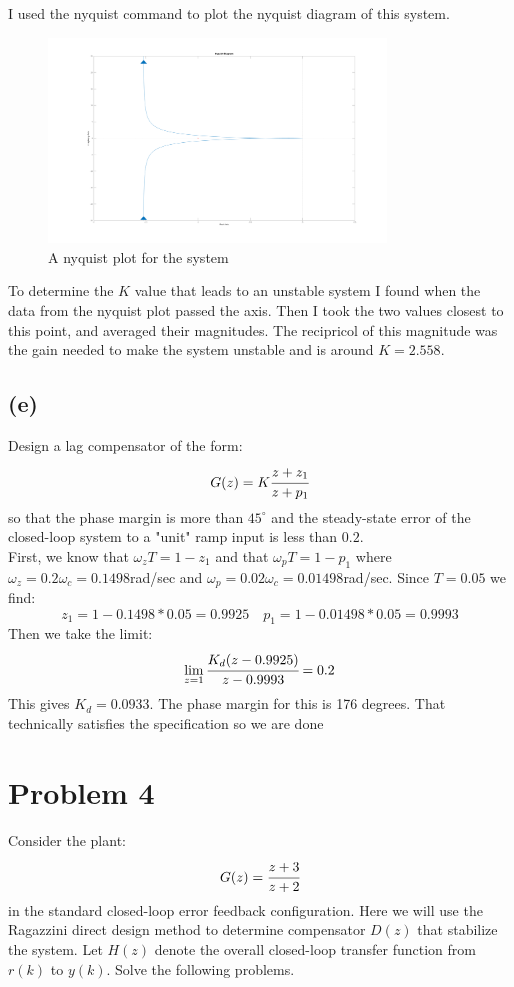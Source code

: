 \documentclass{article}
\begin{document}
I used the nyquist command to plot the nyquist diagram of this system.
\begin{figure}[H]
    \centering
    \includegraphics[width=0.8\textwidth]{PR3_nyquist.png}
    \caption{A nyquist plot for the system}
\end{figure}
To determine the $K$ value that leads to an unstable system I found when the data from the nyquist plot passed the axis. Then I took the two values closest to this point, and averaged their magnitudes. The recipricol of this magnitude was the gain needed to make the system unstable and is around $K=2.558$.

\subsection*{(e)}
Design a lag compensator of the form:
\[G(z)=K\cfrac{z+z_1}{z+p_1}\]
so that the phase margin is more than $45^\circ$ and the steady-state error of the closed-loop system to a "unit" ramp input is less than $0.2$.\\

First, we know that $\omega_z T=1-z_1$ and that $\omega_p T=1-p_1$ where $\omega_z=0.2\omega_c=0.1498$rad/sec and $\omega_p=0.02\omega_c=0.01498$rad/sec. Since $T=0.05$ we find:
\[z_1=1-0.1498*0.05=0.9925 \quad p_1=1-0.01498*0.05=0.9993\]
Then we take the limit:
\[\lim_{z=1}\cfrac{K_d(z-0.9925)}{z-0.9993}=0.2\]
This gives $K_d=0.0933$. The phase margin for this is 176 degrees. That technically satisfies the specification so we are done


\section*{Problem 4}
Consider the plant:
\[G(z)=\cfrac{z+3}{z+2}\]
in the standard closed-loop error feedback configuration. Here we will use the Ragazzini direct design method to determine compensator $D(z)$ that stabilize the system. Let $H(z)$ denote the overall closed-loop transfer function from $r(k)$ to $y(k)$. Solve the following problems.
\end{document}
